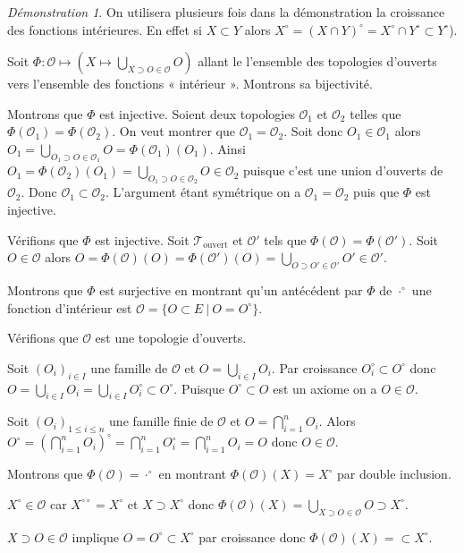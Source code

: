 \documentclass[a4paper, 11pt, french]{book}
\newenvironment{itemise}{\itemize}{\enditemize}
\theoremstyle{plain} %
\theoremstyle{definition} %
\theoremstyle{remark} %
\newtheorem*{demonstration}{Démonstration}
\newcommand{\1}{\mathds{1}}
\newcommand{\scr}[1]{\mathscr{#1}}
\renewcommand{\rm}[1]{\mathrm{#1}}
\newcommand\ens[2]{\{#1 \ |\ #2\}}
\begin{document}
\begin{demonstration}
	On utilisera plusieurs fois dans la démonstration la croissance des fonctions intérieures.
	En effet si $X\subset Y$ alors $X^\circ=(X\cap Y)^\circ=X^\circ\cap Y^\circ\subset Y^\circ$).

	Soit $\Phi\colon\scr{O}\mapsto(X\mapsto\bigcup_{X\supset O\in\scr{O}}O)$ allant le l'ensemble des topologies d'ouverts vers l'ensemble des fonctions « intérieur ».
	Montrons sa bijectivité.
	\begin{itemise}
		\item Montrons que $\Phi$ est injective.
		Soient deux topologies $\scr{O}_1$ et $\scr{O}_2$ telles que $\Phi(\scr{O}_1)=\Phi(\scr{O}_2)$.
		On veut montrer que $\scr{O}_1=\scr{O}_2$.
		Soit donc $O_1\in\scr{O}_1$ alors $O_1=\bigcup_{O_1\supset O\in\scr{O}_1}O=\Phi(\scr{O}_1)(O_1)$.
		Ainsi $O_1=\Phi(\scr{O}_2)(O_1)=\bigcup_{O_1\supset O\in\scr{O}_2}O\in\scr{O}_2$ puisque c'est une union d'ouverts de $\scr{O}_2$.
		Donc $\scr{O}_1\subset\scr{O}_2$.
		L'argument étant symétrique on a $\scr{O}_1=\scr{O}_2$ puis que $\Phi$ est injective.
		\item Vérifions que $\Phi$ est injective.
		Soit $\scr{T_\rm{ouvert}}$ et $\scr{O}'$ tels que $\Phi(\scr{O})=\Phi(\scr{O}')$.
		Soit $O\in\scr{O}$ alors $O=\Phi(\scr{O})(O)=\Phi(\scr{O}')(O)=\bigcup_{O\supset O'\in\scr{O}'}O'\in\scr{O}'$.
		\item Montrons que $\Phi$ est surjective en montrant qu'un antécédent par $\Phi$ de $\cdot^\circ$ une fonction d'intérieur est $\scr{O}=\ens{O\subset E}{O=O^\circ}$.
		\begin{itemise}
			\item Vérifions que $\scr{O}$ est une topologie d'ouverts.
			\begin{itemise}
				\item Soit $(O_i)_{i\in I}$ une famille de $\scr{O}$ et $O=\bigcup_{i\in I}O_i$.
				Par croissance $O_i^\circ\subset O^\circ$ donc $O=\bigcup_{i\in I}O_i=\bigcup_{i\in I}O_i^\circ\subset O^\circ$.
				Puisque $O^\circ\subset O$ est un axiome on a $O\in\scr{O}$.
				\item Soit $(O_i)_{1\leqslant i\leqslant n}$ une famille finie de $\scr{O}$ et $O=\bigcap_{i=1}^nO_i$.
				Alors $O^\circ=(\bigcap_{i=1}^nO_i)^\circ=\bigcap_{i=1}^nO_i^\circ=\bigcap_{i=1}^nO_i=O$ donc $O\in\scr{O}$.
			\end{itemise}
			\item Montrons que $\Phi(\scr{O})=\cdot^\circ$ en montrant $\Phi(\scr{O})(X)=X^\circ$ par double inclusion.
			\begin{itemise}
				\item $X^\circ\in\scr{O}$ car $X^{\circ\circ}=X^\circ$ et $X\supset X^\circ$ donc $\Phi(\scr{O})(X)=\bigcup_{X\supset O\in\scr{O}}O\supset X^\circ$.
				\item $X\supset O\in\scr{O}$ implique $O=O^\circ\subset X^\circ$ par croissance donc $\Phi(\scr{O})(X)=\subset X^\circ$.
			\end{itemise}
		\end{itemise}
	\end{itemise}
\end{demonstration}
\end{document}
